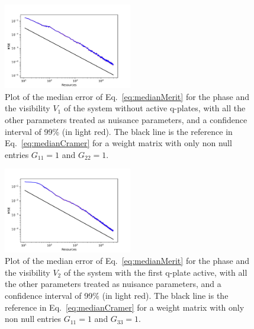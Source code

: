 \documentclass[aps, pra, 10pt, twocolumn, superscriptaddress,floatfix]{revtex4-1}
\begin{document}
\begin{figure}[!th]
	\begin{center}
		\includegraphics[width=0.5\textwidth]{phaseAndVisibilities/estimation1100011000.pdf}
	\end{center}
	\caption{Plot of the median error of Eq.~\eqref{eq:medianMerit} for the phase and the visibility $V_1$ of the system without active q-plates, with all the other parameters treated as nuisance parameters, and a confidence interval of 99\% (in light red). The black line is the reference in Eq.~\eqref{eq:medianCramer} for a weight matrix with only non null entries $G_{11} = 1$ and $G_{22} = 1$.}	
	\label{fig:estimation11000}
\end{figure}
%
\begin{figure}[!th]
	\begin{center}
		\includegraphics[width=0.5\textwidth]{phaseAndVisibilities/estimation1010010100.pdf}
	\end{center}
	\caption{Plot of the median error of Eq.~\eqref{eq:medianMerit} for the phase and the visibility $V_2$ of the system with the first q-plate active, with all the other parameters treated as nuisance parameters, and a confidence interval of 99\% (in light red). The black line is the reference in Eq.~\eqref{eq:medianCramer} for a weight matrix with only non null entries $G_{11} = 1$ and $G_{33} = 1$.}
	\label{fig:estimation10100}
\end{figure}
%
\end{document}
